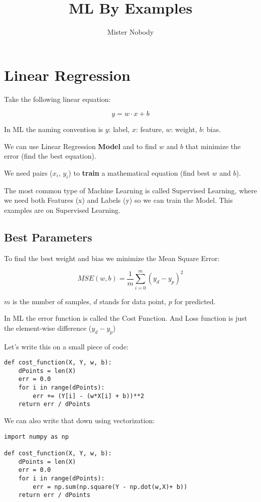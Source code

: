 \documentclass{article}
\author{Mister Nobody}
\title{ML By Examples}
\begin{document}
\maketitle
\tableofcontents
\section{Linear Regression}

Take the following linear equation:

$$y = w\cdot{}x + b$$

In ML the naming convention is $y$: label, $x$: feature, $w$: weight, $b$: bias. 

We can use Linear Regression \textbf{Model} and to find $w$ and $b$ that minimize the error (find the best equation).

We need pairs ($x_i$, $y_i$) to \textbf{train} a mathematical equation (find best $w$ and $b$). 

The most common type of Machine Learning is called Supervised Learning, where we need both Features (x) and Labels (y) so we can train the Model. This examples are on Supervised Learning.

\subsection{Best Parameters}

To find the best weight and bias we minimize the Mean Square Error:

$$ MSE(w,b) = \frac{1}{m}\sum_{i=0}^m (y_{d} - y_{p})^2 $$

$m$ is the number of samples, $d$ stands for data point, $p$ for predicted.

In ML the error function is called the Cost Function. And Loss function is just the element-wise difference ($y_d - y_p$)

Let's write this on a small piece of code:

\begin{verbatim}
def cost_function(X, Y, w, b):
    dPoints = len(X)
    err = 0.0
    for i in range(dPoints):
        err += (Y[i] - (w*X[i] + b))**2
    return err / dPoints
\end{verbatim}
We can also write that down using vectorization:

\begin{verbatim}
import numpy as np

def cost_function(X, Y, w, b):
    dPoints = len(X)
    err = 0.0
    for i in range(dPoints):
        err = np.sum(np.square(Y - np.dot(w,X)+ b))
    return err / dPoints
\end{verbatim}
\end{document}
